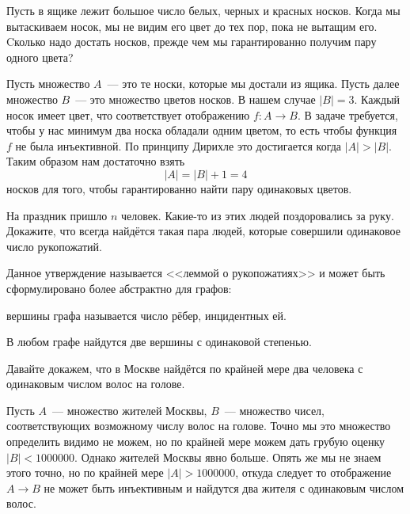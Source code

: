 \begin{example}
Пусть в ящике лежит большое число белых, черных и красных носков. Когда мы вытаскиваем носок, мы не видим его цвет до тех пор, пока не вытащим его. Cколько надо достать носков, прежде чем мы гарантированно получим пару одного цвета?
\end{example}

Пусть множество $A$~--- это те носки, которые мы достали из ящика. Пусть далее множество $B$~--- это множество цветов носков. В нашем случае $|B|=3$. Каждый носок имеет цвет, что соответствует отображению $f:A\to B$. В задаче требуется, чтобы у нас минимум два носка обладали одним цветом, то есть чтобы функция $f$ не была инъективной. По принципу Дирихле это достигается когда $|A|>|B|$. Таким образом нам достаточно взять $$|A|=|B|+1 = 4$$ носков для того, чтобы гарантированно найти пару одинаковых цветов.

\begin{exercise}
На праздник пришло $n$ человек. Какие-то из этих людей поздоровались за руку. Докажите, что всегда найдётся такая пара людей, которые совершили одинаковое число рукопожатий.
\end{exercise}

Данное утверждение называется <<леммой о рукопожатиях>> и может быть сформулировано более абстрактно для графов:

\begin{definition}
 вершины графа называется число рёбер, инцидентных ей.
\end{definition}

\begin{HandshakesLemma}
В любом графе найдутся две вершины с одинаковой степенью.
\end{HandshakesLemma}

\begin{example}
Давайте докажем, что в Москве найдётся по крайней мере два человека с одинаковым числом волос на голове.

Пусть $A$~--- множество жителей Москвы, $B$~--- множество чисел, соответствующих возможному числу волос на голове. Точно мы это множество определить видимо не можем, но по крайней мере можем дать грубую оценку $|B|<1000000$. Однако жителей Москвы явно больше. Опять же мы не знаем этого точно, но по крайней мере $|A|>1000000$, откуда следует то отображение $A\to B$ не может быть инъективным и найдутся два жителя с одинаковым числом волос.
\end{example}


